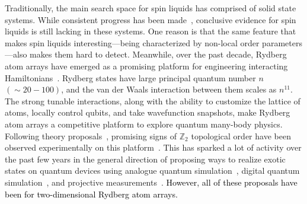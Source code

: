 \documentclass[twocolumn,superscriptaddress,amsmath,amssymb,aps,prx,nofootinbib]{revtex4-2}
\newcommand{\newtext}[1]{\textcolor{black}{#1}}
\begin{document}
Traditionally, the main search space for spin liquids has comprised of solid state systems. While consistent progress has been made~\cite{savary2017,knolle2019field}, conclusive evidence for spin liquids is still lacking in these systems. One reason is that the same feature that makes spin liquids interesting---being characterized by non-local order parameters---also makes them hard to detect. Meanwhile, over the past decade, Rydberg atom arrays have emerged as a promising platform for engineering interacting Hamiltonians~\cite{weimer2010rydberg,ebadi2021quantum,wu2021concise,saffman2010,lukin2001,labuhn2016,jaksch2000,browaeys2016,barredo2016anatom,beguin2013,barredo2018,semeghini2021, bernien2017probing,bluvstein2022quantum,guardado-sanchez2018probing,keesling2019quantum,levine2019parallel,lienhard2018observing,madjarov2020highfidelity,omran2019generation,schauss2015crystallization,song2021quantum}. Rydberg states have large principal quantum number $n$ $(\sim 20-100)$, and the van der Waals interaction between them scales as $n^{11}$. The strong tunable interactions, along with the ability to customize the lattice of atoms, locally control qubits, and take wavefunction snapshots, make Rydberg atom arrays a competitive platform to explore quantum many-body physics. Following theory proposals~\cite{verresen2021,samajdar2021}, promising signs of $\mathbb{Z}_2$ topological order have been observed experimentally on this platform~\cite{semeghini2021}. This has sparked a lot of activity over the past few years in the general direction of proposing ways to realize exotic states on quantum devices using analogue quantum simulation~\cite{myerson2022construction,slagle2022quantum, giudice2022trimer,zhou2022quantum, tarabunga2023classification, kornjaca2023trimer,ohler2023quantum}, digital quantum simulation~\cite{liu2021methods}, and projective measurements~\cite{tantivasadakarn2022shortest,verresen2021efficiently}. \newtext{However, all of these proposals have been for two-dimensional Rydberg atom arrays.} 
\end{document}
